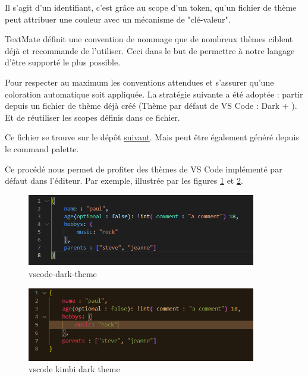 \documentclass[
    iict, %
    il, %
]{heig-tb}
\begin{document}
Il s'agit d'un identifiant, c'est grâce au scope d'un token, qu'un fichier de thème peut attribuer une couleur avec un mécanisme de "clé-valeur".

TextMate définit une convention de nommage que de nombreux thèmes ciblent déjà et recommande de l'utiliser.
Ceci dans le but de permettre à notre langage d'être supporté le plus possible. \cite{textmate-grammars}

Pour respecter au maximum les conventions attendues et s'assurer qu'une coloration automatique soit appliquée.
La stratégie suivante a été adoptée : partir depuis un fichier de thème déjà créé (Thème par défaut de VS Code : Dark + ).
Et de réutiliser les scopes définis dans ce fichier.

Ce fichier se trouve sur le dépôt \href{https://github.com/microsoft/vscode/blob/main/extensions/theme-defaults/themes/dark_vs.json}{suivant}.
Mais peut être également généré depuis le command palette.

Ce procédé nous permet de profiter des thèmes de VS Code implémenté par défaut dans l'éditeur. Par exemple, illustrée par les figures \ref{vscode-dark-theme} et \ref{vscode-kimbi-dark-theme}.

\begin{figure}[!h]
    \begin{center}
        \includegraphics[width=10cm]{assets/figures/vscode-dark-theme.PNG}
    \end{center}
    \caption[UON en Thème vscode dark]{\label{vscode-dark-theme} vscode-dark-theme}
\end{figure}

\begin{figure}[!h]
    \begin{center}
        \includegraphics[width=10cm]{assets/figures/vscode-kimbi-dark-theme.PNG}
    \end{center}
    \caption[UON en Thème vscode kimbi dark]{\label{vscode-kimbi-dark-theme} vscode kimbi dark theme}
\end{figure}
\end{document}
